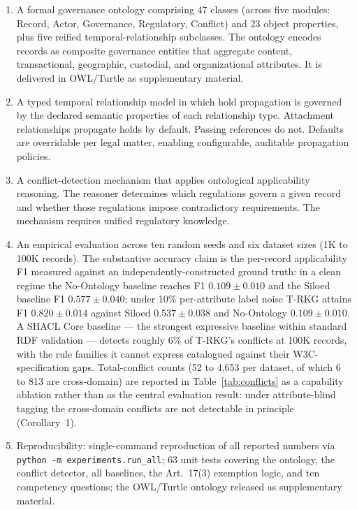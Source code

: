 \documentclass{ieeeaccess}
\begin{document}
\begin{enumerate}
    \item A formal governance ontology comprising 47 classes (across five modules: Record, Actor, Governance, Regulatory, Conflict) and 23 object properties, plus five reified temporal-relationship subclasses. The ontology encodes records as composite governance entities that aggregate content, transactional, geographic, custodial, and organizational attributes. It is delivered in OWL/Turtle as supplementary material.
    \item A typed temporal relationship model in which hold propagation is governed by the declared semantic properties of each relationship type. Attachment relationships propagate holds by default. Passing references do not. Defaults are overridable per legal matter, enabling configurable, auditable propagation policies.
    \item A conflict-detection mechanism that applies ontological applicability reasoning. The reasoner determines which regulations govern a given record and whether those regulations impose contradictory requirements. The mechanism requires unified regulatory knowledge.
    \item An empirical evaluation across ten random seeds and six dataset sizes (1K to 100K records). The substantive accuracy claim is the per-record applicability F1 measured against an independently-constructed ground truth: in a clean regime the No-Ontology baseline reaches F1 $0.109 \pm 0.010$ and the Siloed baseline F1 $0.577 \pm 0.040$; under 10\% per-attribute label noise T-RKG attains F1 $0.820 \pm 0.014$ against Siloed $0.537 \pm 0.038$ and No-Ontology $0.109 \pm 0.010$. A SHACL Core baseline --- the strongest expressive baseline within standard RDF validation --- detects roughly 6\% of T-RKG's conflicts at 100K records, with the rule families it cannot express catalogued against their W3C-specification gaps. Total-conflict counts (52 to 4{,}653 per dataset, of which 6 to 813 are cross-domain) are reported in Table~\ref{tab:conflicts} as a capability ablation rather than as the central evaluation result: under attribute-blind tagging the cross-domain conflicts are not detectable in principle (Corollary~1).
    \item Reproducibility: single-command reproduction of all reported numbers via \texttt{python -m experiments.run\_all}; 63 unit tests covering the ontology, the conflict detector, all baselines, the Art.~17(3) exemption logic, and ten competency questions; the OWL/Turtle ontology released as supplementary material.
\end{enumerate}
\end{document}
